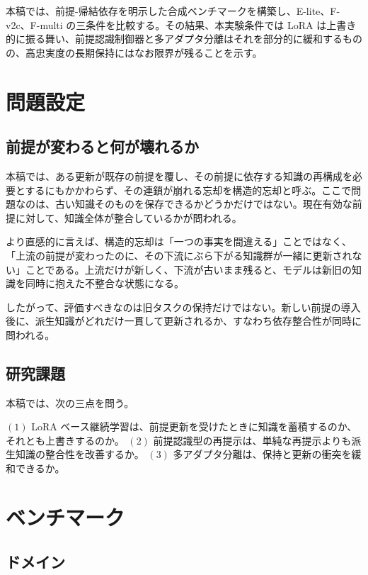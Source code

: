 \documentclass[12pt,a4paper]{article}
\begin{document}
本稿では、前提-帰結依存を明示した合成ベンチマークを構築し、E-lite、F-v2c、F-multi の三条件を比較する。その結果、本実験条件では LoRA は上書き的に振る舞い、前提認識制御器と多アダプタ分離はそれを部分的に緩和するものの、高忠実度の長期保持にはなお限界が残ることを示す。

\section{問題設定}\label{ux554fux984cux8a2dux5b9a}

\subsection{前提が変わると何が壊れるか}\label{ux524dux63d0ux304cux5909ux308fux308bux3068ux4f55ux304cux58caux308cux308bux304b}

本稿では、ある更新が既存の前提を覆し、その前提に依存する知識の再構成を必要とするにもかかわらず、その連鎖が崩れる忘却を構造的忘却と呼ぶ。ここで問題なのは、古い知識そのものを保存できるかどうかだけではない。現在有効な前提に対して、知識全体が整合しているかが問われる。

より直感的に言えば、構造的忘却は「一つの事実を間違える」ことではなく、「上流の前提が変わったのに、その下流にぶら下がる知識群が一緒に更新されない」ことである。上流だけが新しく、下流が古いまま残ると、モデルは新旧の知識を同時に抱えた不整合な状態になる。

したがって、評価すべきなのは旧タスクの保持だけではない。新しい前提の導入後に、派生知識がどれだけ一貫して更新されるか、すなわち依存整合性が同時に問われる。

\subsection{研究課題}\label{ux7814ux7a76ux8ab2ux984c}

本稿では、次の三点を問う。

\((1)\) LoRA ベース継続学習は、前提更新を受けたときに知識を蓄積するのか、それとも上書きするのか。 \((2)\) 前提認識型の再提示は、単純な再提示よりも派生知識の整合性を改善するか。 \((3)\) 多アダプタ分離は、保持と更新の衝突を緩和できるか。

\section{ベンチマーク}\label{ux30d9ux30f3ux30c1ux30deux30fcux30af}

\subsection{ドメイン}\label{ux30c9ux30e1ux30a4ux30f3}
\end{document}
